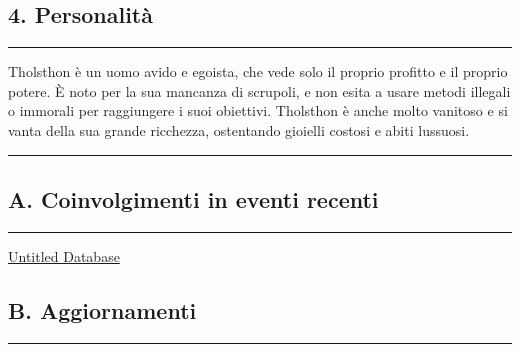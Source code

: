 \subsection{4. Personalità}\label{personalituxe0}

\begin{center}\rule{0.5\linewidth}{0.5pt}\end{center}

Tholsthon è un uomo avido e egoista, che vede solo il proprio profitto e
il proprio potere. È noto per la sua mancanza di scrupoli, e non esita a
usare metodi illegali o immorali per raggiungere i suoi obiettivi.
Tholsthon è anche molto vanitoso e si vanta della sua grande ricchezza,
ostentando gioielli costosi e abiti lussuosi.

\begin{center}\rule{0.5\linewidth}{0.5pt}\end{center}

\subsection{A. Coinvolgimenti in eventi
recenti}\label{a.-coinvolgimenti-in-eventi-recenti}

\begin{center}\rule{0.5\linewidth}{0.5pt}\end{center}

\href{Untitled\%20Database\%209f53e1bff1174ede884f4b52cee86e8c.csv}{Untitled
Database}

\subsection{B. Aggiornamenti}\label{b.-aggiornamenti}

\begin{center}\rule{0.5\linewidth}{0.5pt}\end{center}

\href{Untitled\%20d9e5fb5b7a0042f9b99de48e09e1a7c6.csv}{}
